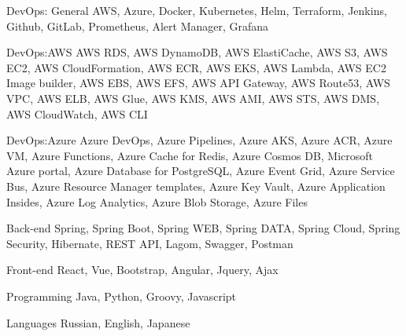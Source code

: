 

\begin{cvskills}

  \cvskill
    {DevOps: General} %
    {AWS, Azure, Docker, Kubernetes, Helm, Terraform, Jenkins, Github, GitLab, Prometheus, Alert Manager, Grafana } %

  \cvskill
    {DevOps:AWS} %
    {AWS RDS, AWS DynamoDB, AWS ElastiCache, AWS S3, AWS EC2, AWS CloudFormation,
     AWS ECR, AWS EKS, AWS Lambda, AWS EC2 Image builder, AWS EBS, AWS EFS, AWS API Gateway,
      AWS Route53, AWS VPC, AWS ELB, AWS Glue, AWS KMS, AWS AMI, AWS STS, AWS DMS, AWS CloudWatch, AWS CLI} %

  \cvskill
    {DevOps:Azure} %
    {Azure DevOps, Azure Pipelines, Azure AKS, Azure ACR, Azure VM, Azure Functions, Azure Cache for Redis,
     Azure Cosmos DB, Microsoft Azure portal, Azure Database for PostgreSQL, Azure Event Grid, Azure Service Bus,
      Azure Resource Manager templates, Azure Key Vault, Azure Application Insides, Azure Log Analytics, Azure Blob Storage, Azure Files} %

  \cvskill
    {Back-end} %
    {Spring, Spring Boot, Spring WEB, Spring DATA, Spring Cloud, Spring Security, Hibernate, REST API, Lagom, Swagger, Postman} %

  \cvskill
    {Front-end} %
    {React, Vue, Bootstrap, Angular, Jquery, Ajax} %

  \cvskill
    {Programming} %
    {Java, Python, Groovy, Javascript} %

  \cvskill
    {Languages} %
    {Russian, English, Japanese} %

\end{cvskills}
